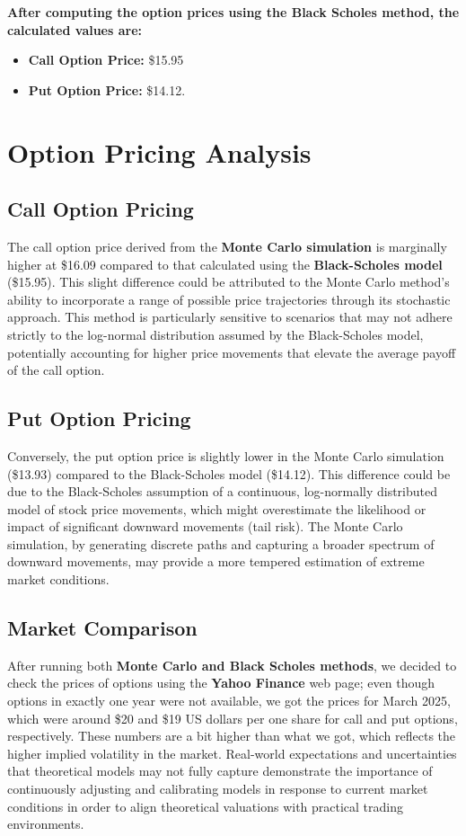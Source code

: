 \documentclass{article}
\begin{document}
\textbf{After computing the option prices using the Black Scholes method, the calculated values are:}
\begin{itemize}
    \item \textbf{Call Option Price:} \$15.95
    \item \textbf{Put Option Price:} \$14.12.
\end{itemize}

\section*{Option Pricing Analysis}

\subsection*{Call Option Pricing}

The call option price derived from the \textbf{Monte Carlo simulation} is marginally higher at \$16.09 compared to that calculated using the \textbf{Black-Scholes model} (\$15.95). This slight difference could be attributed to the Monte Carlo method's ability to incorporate a range of possible price trajectories through its stochastic approach. This method is particularly sensitive to scenarios that may not adhere strictly to the log-normal distribution assumed by the Black-Scholes model, potentially accounting for higher price movements that elevate the average payoff of the call option.

\subsection*{Put Option Pricing}

Conversely, the put option price is slightly lower in the Monte Carlo simulation (\$13.93) compared to the Black-Scholes model (\$14.12). This difference could be due to the Black-Scholes assumption of a continuous, log-normally distributed model of stock price movements, which might overestimate the likelihood or impact of significant downward movements (tail risk). The Monte Carlo simulation, by generating discrete paths and capturing a broader spectrum of downward movements, may provide a more tempered estimation of extreme market conditions.

\subsection*{Market Comparison}

After running both \textbf{Monte Carlo and Black Scholes methods}, we decided to check the prices of options using the \textbf{Yahoo Finance} web page; even though options in exactly one year were not available, we got the prices for March 2025, which were around \$20 and \$19 US dollars per one share for call and put options, respectively. These numbers are a bit higher than what we got, which reflects the higher implied volatility in the market. Real-world expectations and uncertainties that theoretical models may not fully capture demonstrate the importance of continuously adjusting and calibrating models in response to current market conditions in order to align theoretical valuations with practical trading environments.
\end{document}

